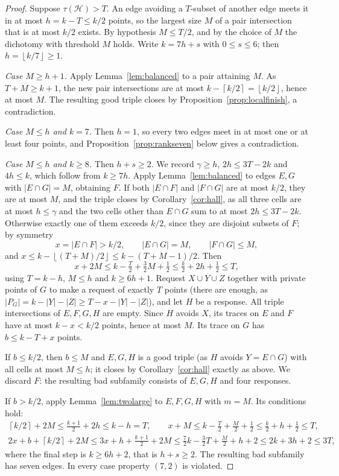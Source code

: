 \documentclass[11pt]{article}
\numberwithin{equation}{section}
\theoremstyle{definition}
\theoremstyle{remark}
\newcommand{\HH}{\mathcal H}
\newcommand{\ceil}[1]{\left\lceil #1\right\rceil}
\newcommand{\floor}[1]{\left\lfloor #1\right\rfloor}
\begin{document}
\begin{proof}
Suppose $\tau(\HH)>T$. An edge avoiding a $T$-subset of another edge
meets it in at most $h=k-T\le k/2$ points, so the largest size $M$ of a
pair intersection that is at most $k/2$ exists. By hypothesis
$M\le T/2$, and by the choice of $M$ the dichotomy with threshold $M$
holds. Write $k=7h+s$ with $0\le s\le6$; then $h=\floor{k/7}\ge1$.

\emph{Case $M\ge h+1$.} Apply Lemma~\ref{lem:balanced} to a pair
attaining $M$. As $T+M\ge k+1$, the new pair intersections are at most
$k-\ceil{k/2}=\floor{k/2}$, hence at most $M$. The resulting good
triple closes by Proposition~\ref{prop:localfinish}, a contradiction.

\emph{Case $M\le h$ and $k=7$.} Then $h=1$, so every two edges meet in
at most one or at least four points, and
Proposition~\ref{prop:rankseven} below gives a contradiction.

\emph{Case $M\le h$ and $k\ge8$.} Then $h+s\ge2$. We record $\gamma\ge h$, $2h\le3T-2k$ and $4h\le k$,
which follow from $k\ge7h$. Apply Lemma~\ref{lem:balanced} to edges
$E,G$ with $|E\cap G|=M$, obtaining $F$. If both $|E\cap F|$ and
$|F\cap G|$ are at most $k/2$, they are at most $M$, and the triple
closes by Corollary~\ref{cor:hall}, as all three cells are at most
$h\le\gamma$ and the two cells other than $E\cap G$ sum to at most
$2h\le3T-2k$. Otherwise exactly one of them exceeds $k/2$, since they
are disjoint subsets of $F$; by symmetry
\[
 x=|E\cap F|>k/2,\qquad |E\cap G|=M,\qquad |F\cap G|\le M,
\]
and $x\le k-\floor{(T+M)/2}\le k-(T+M-1)/2$. Then
\[
 x+2M\le k-\tfrac T2+\tfrac32M+\tfrac12\le\tfrac k2+2h+\tfrac12\le T,
\]
using $T=k-h$, $M\le h$ and $k\ge6h+1$. Request $X\cup Y\cup Z$ together
with private points of $G$ to make a request of exactly $T$ points (there
are enough, as $|P_G|=k-|Y|-|Z|\ge T-x-|Y|-|Z|$), and let $H$ be a
response. All triple intersections of $E,F,G,H$ are empty. Since $H$
avoids $X$, its traces on $E$ and $F$ have at most $k-x<k/2$ points,
hence at most $M$. Its trace on $G$ has $b\le k-T+x$ points.

If $b\le k/2$, then $b\le M$ and $E,G,H$ is a good triple (as $H$ avoids
$Y=E\cap G$) with all cells at most $M\le h$; it closes by
Corollary~\ref{cor:hall} exactly as above. We discard $F$: the resulting
bad subfamily consists of $E,G,H$ and four responses.

If $b>k/2$, apply Lemma~\ref{lem:twolarge} to $E,F,G,H$ with $m=M$. Its
conditions hold:
\begin{gather*}
 \ceil{k/2}+2M\le\tfrac{k+1}2+2h\le k-h=T,\qquad
 x+M\le k-\tfrac T2+\tfrac M2+\tfrac12\le\tfrac k2+h+\tfrac12\le T,\\
 2x+b+\ceil{k/2}+2M\le3x+h+\tfrac{k+1}2+2M
 \le\tfrac72k-\tfrac32T+\tfrac M2+h+2\le2k+3h+2\le3T,
\end{gather*}
where the final step is $k\ge6h+2$, that is $h+s\ge2$. The resulting bad
subfamily has seven edges. In every case property $(7,2)$ is violated.
\end{proof}
\end{document}
